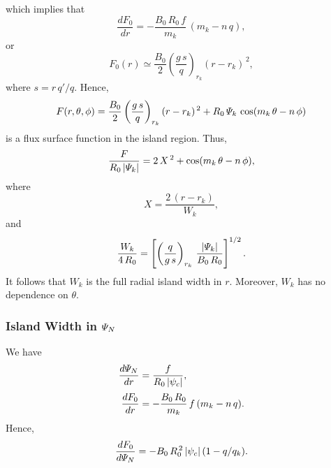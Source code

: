 \documentclass[12pt]{article}
\begin{document}
which implies that
\begin{equation}
\frac{dF_0}{dr} = -\frac{B_0\,R_0\,f}{m_k}\,(m_k-n\,q),
\end{equation}
or
\begin{equation}
F_0(r) \simeq \frac{B_0}{2}\left(\frac{g\,s}{q}\right)_{r_k} (r-r_k)^{\,2},
\end{equation}
where $s=r\,q'/q$. 
Hence,
\begin{equation}
F(r,\theta,\phi) = \frac{B_0}{2}\left(\frac{g\,s}{q}\right)_{r_k}(r-r_k)^{\,2}
+R_0\,{\mit\Psi}_k\,\cos(m_k\,\theta-n\,\phi)
\end{equation}
is a flux surface function in the island region. 
Thus, 
\begin{equation}
\frac{F}{R_0\,|{\mit\Psi}_k|}= 2\,X^{\,2} + \cos(m_k\,\theta-n\,\phi),
\end{equation}
where
\begin{equation}
X = \frac{2\,(r-r_k)}{W_k},
\end{equation}
and
\begin{equation}
\frac{W_k}{4\,R_0} = \left[\left(\frac{q}{g\,s}\right)_{r_k}\,\frac{|{\mit\Psi}_k|}{B_0\,R_0}\right]^{1/2}.
\end{equation}
It follows that $W_k$ is the full radial island width  in $r$. Moreover, $W_k$ has no dependence on $\theta$.

\subsubsection{Island Width in ${\mit\Psi}_N$}
We have
\begin{align}
\frac{d{\mit\Psi}_N}{dr} &= \frac{f}{R_0\,|\psi_c|},\\[0.5ex]
\frac{dF_0}{dr} &= -\frac{B_0\,R_0}{m_k}\,f\,(m_k-n\,q).
\end{align}
Hence,
\begin{equation}
\frac{dF_0}{d{\mit\Psi}_N} = -B_0\,R_0^{\,2}\,|\psi_c|\,(1-q/q_k).
\end{equation}
\end{document}
